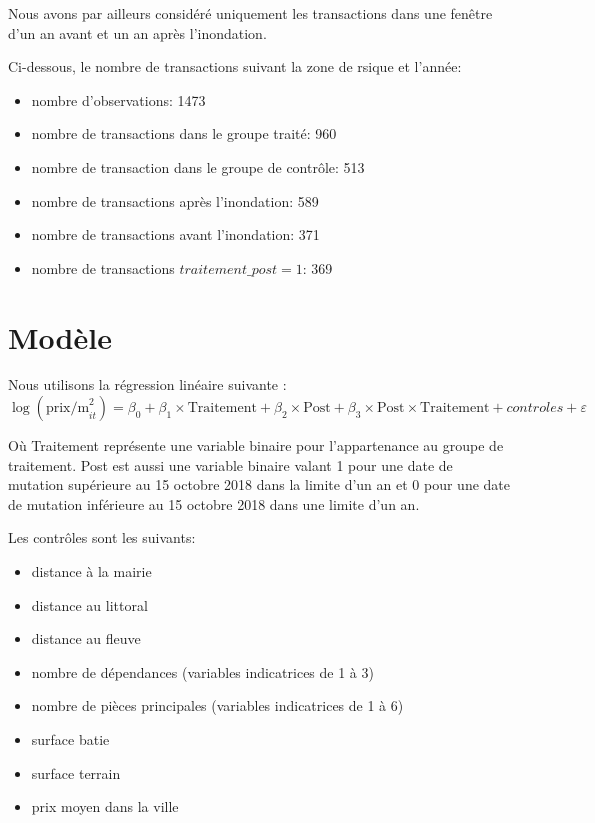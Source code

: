 \documentclass[a4paper,12pt]{article}
\begin{document}
Nous avons par ailleurs considéré uniquement les transactions dans une fenêtre d'un an avant et un an après l'inondation.\newline

Ci-dessous, le nombre de transactions suivant la zone de rsique et l'année: 
\begin{itemize}
\item nombre d'observations: 1473
\item nombre de transactions dans le groupe traité: 960
\item nombre de transaction dans le groupe de contrôle: 513
\item nombre de transactions après l'inondation: 589
\item nombre de transactions avant l'inondation: 371
\item nombre de transactions $traitement\_post = 1$: 369
\end{itemize}


\section{Modèle}
Nous utilisons la régression linéaire suivante :
\begin{equation}
	\log(\text{prix/m}^2_{it}) = \beta_0 + \beta_1 \times \text{Traitement} + \beta_2 \times \text{Post} + \beta_3 \times \text{Post} \times \text{Traitement} + controles + \varepsilon
\end{equation}

Où Traitement représente une variable binaire pour l'appartenance au groupe de traitement. Post est aussi une variable binaire valant 1 pour une date de mutation supérieure au 15 octobre 2018 dans la limite d'un an et 0 pour une date de mutation inférieure au 15 octobre 2018 dans une limite d'un an. \newline

Les contrôles sont les suivants:
\begin{itemize}
\item distance à la mairie
\item distance au littoral
\item distance au fleuve
\item nombre de dépendances (variables indicatrices de 1 à 3)
\item nombre de pièces principales (variables indicatrices de 1 à 6)
\item surface batie
\item surface terrain
\item prix moyen dans la ville
\end{itemize}
\end{document}
